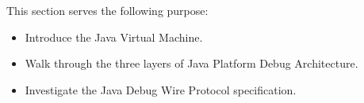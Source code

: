 \documentclass[..thesis.tex]{subfiles}
\begin{document}
This section serves the following purpose:

\begin{itemize}
  \item 
    Introduce the Java Virtual Machine.
  \item 
    Walk through the three layers of Java Platform Debug Architecture.
  \item 
    Investigate the Java Debug Wire Protocol specification. 
\end{itemize}
\end{document}
